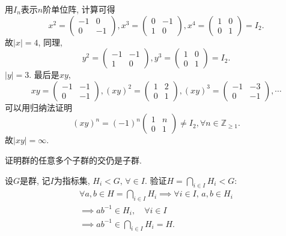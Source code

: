 \begin{solution}
    用$I_n$表示$n$阶单位阵, 计算可得
\[
x^2 = \begin{pmatrix} 
    -1 & 0 \\
    0 & -1
\end{pmatrix},
x^3 = \begin{pmatrix}
    0 & -1 \\
    1 & 0
\end{pmatrix},
x^4 = \begin{pmatrix}
    1 & 0 \\
    0 & 1
\end{pmatrix} = I_2.
\]
故$|x| = 4$, 同理,
\[
y^2 = \begin{pmatrix}
    -1 & -1 \\
    1 & 0
\end{pmatrix},
y^3 = \begin{pmatrix}
    1 & 0 \\
    0 & 1
\end{pmatrix} = I_2.
\]
$|y| = 3$.
最后是$xy$,
\[
xy = \begin{pmatrix}
    -1 & -1 \\
    0 & -1
\end{pmatrix},
(xy)^2 = \begin{pmatrix}
    1 & 2 \\
    0 & 1
\end{pmatrix},
(xy)^3 = \begin{pmatrix}
    -1 & -3 \\
    0 & -1
\end{pmatrix}, \cdots
\]
可以用归纳法证明
\[
    (xy)^n = (-1)^n\begin{pmatrix}
        1 & n \\
        0 & 1
    \end{pmatrix} \neq I_2, \forall n \in \mathbb{Z}_{\geqslant 1}.
\]
故$|xy| = \infty$.
\end{solution}
    
\begin{problem}
    证明群的任意多个子群的交仍是子群.
\end{problem}

\begin{solution}
    设$G$是群, 记$I$为指标集, $H_i < G,\, \forall \in I$.
验证\(H = \displaystyle\bigcap_{i \in I} H_i < G\):
\[
\begin{gathered}
    \forall a, b \in H = \bigcap_{i \in I} H_i \implies \forall i \in I,\,a, b \in H_i\\
    \implies ab^{-1} \in H_i, \quad \forall i \in I\\
    \implies ab^{-1} \in \bigcap_{i \in I} H_i = H.
\end{gathered}
\]
\end{solution}